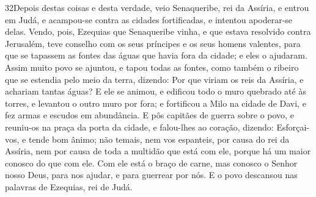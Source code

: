 \lettrine{32} Depois destas coisas e desta verdade, veio
Senaqueribe, rei da Assíria, e entrou em Judá, e acampou-se contra
as cidades fortificadas, e intentou apoderar-se delas. Vendo,
pois, Ezequias que Senaqueribe vinha, e que estava resolvido contra
Jerusalém, teve conselho com os seus príncipes e os seus homens
valentes, para que se tapassem as fontes das águas que havia fora da
cidade; e eles o ajudaram. Assim muito povo se ajuntou, e tapou
todas as fontes, como também o ribeiro que se estendia pelo meio da
terra, dizendo: Por que viriam os reis da Assíria, e achariam tantas
águas? E ele se animou, e edificou todo o muro quebrado até às
torres, e levantou o outro muro por fora; e fortificou a Milo na
cidade de Davi, e fez armas e escudos em abundância. E pôs
capitães de guerra sobre o povo, e reuniu-os na praça da porta da
cidade, e falou-lhes ao coração, dizendo: Esforçai-vos, e tende
bom ânimo; não temais, nem vos espanteis, por causa do rei da
Assíria, nem por causa de toda a multidão que está com ele, porque
há um maior conosco do que com ele. Com ele está o braço de
carne, mas conosco o Senhor nosso Deus, para nos ajudar, e para
guerrear por nós. E o povo descansou nas palavras de Ezequias, rei
de Judá.

